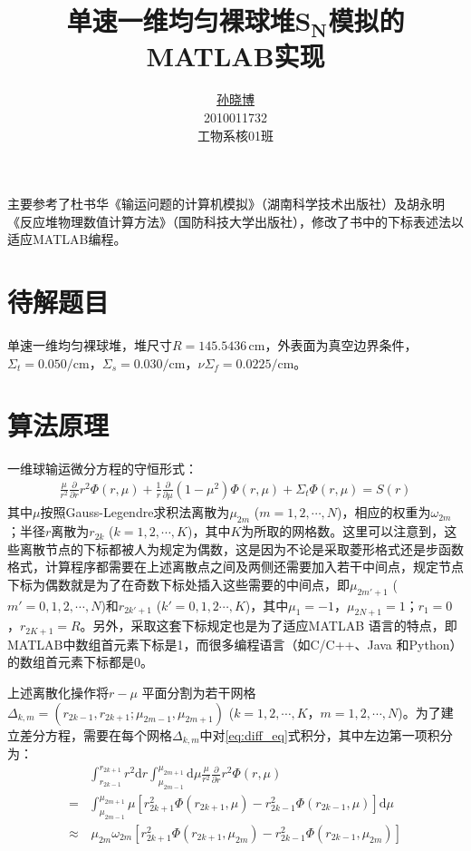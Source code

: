 \documentclass[a4paper,10.5pt]{article}
\title{\heiti 单速一维均匀裸球堆$\boldsymbol{S_{N}}$模拟的MATLAB实现}
\author{\href{mailto:sunxb10@gmail.com}{孙晓博}\\2010011732\\{}工物系核01班}
\date{}
\newcommand\md {\mathrm{d}}
\newcommand \kaiti {\CJKfamily{KaiTi}}
\begin{document}
\maketitle
{\kaiti 主要参考了杜书华《输运问题的计算机模拟》（湖南科学技术出版社）及胡永明《反应堆物理数值计算方法》（国防科技大学出版社），修改了书中的下标表述法以适应MATLAB编程。}\par
\section{待解题目}
单速一维均匀裸球堆，堆尺寸$R=145.5436\,\mathrm{cm}$，外表面为真空边界条件，$\Sigma_{t}=0.050/\mathrm{cm}$，$\Sigma_{s}=0.030/\mathrm{cm}$，$\nu\Sigma_{f}=0.0225/\mathrm{cm}$。\par
\section{算法原理}
一维球输运微分方程的守恒形式：
\begin{align}
\frac{\mu}{r^{2}}\frac{\partial}{\partial{}r}r^{2}\Phi(r,\mu)+\frac{1}{r}\frac{\partial}{\partial\mu}(1-\mu^{2})\Phi(r,\mu)+\Sigma_{t}\Phi(r,\mu)
=S(r)\label{eq:diff_eq}
\end{align}
其中$\mu$按照Gauss-Legendre求积法离散为$\mu_{2m}$ ($m=1,2,\cdots,N$)，相应的权重为$\omega_{2m}$；半径$r$离散为$r_{2k}$ ($k=1,2,\cdots,K$)，其中$K$为所取的网格数。这里可以注意到，这些离散节点的下标都被人为规定为偶数，这是因为不论是采取菱形格式还是步函数格式，计算程序都需要在上述离散点之间及两侧还需要加入若干中间点，规定节点下标为偶数就是为了在奇数下标处插入这些需要的中间点，即$\mu_{2m'+1}$ ($m'=0,1,2,\cdots,N$)和$r_{2k'+1}$ ($k'=0,1,2\cdots,K$)，其中$\mu_{1}=-1$，$\mu_{2N+1}=1$；$r_{1}=0$，$r_{2K+1}=R$。另外，采取这套下标规定也是为了适应MATLAB 语言的特点，即MATLAB中数组首元素下标是1，而很多编程语言（如C/C++、Java 和Python）的数组首元素下标都是0。\par
上述离散化操作将$r-\mu$ 平面分割为若干网格$\Delta_{k,m}=(r_{2k-1},r_{2k+1};\mu_{2m-1},\mu_{2m+1})$ ($k=1,2,\cdots,K$，$m=1,2,\cdots,N$)。为了建立差分方程，需要在每个网格$\Delta_{k,m}$中对\eqref{eq:diff_eq}式积分，其中左边第一项积分为：
\begin{align*}
&\int_{r_{2k-1}}^{r_{2k+1}}r^{2}\md{}r\int_{\mu_{2m-1}}^{\mu_{2m+1}}\md\mu\frac{\mu}{r^{2}}\frac{\partial}{\partial{}r}r^{2}\Phi(r,\mu)\\
=&\int_{\mu_{2m-1}}^{\mu_{2m+1}}\mu\left[r_{2k+1}^{2}\Phi(r_{2k+1},\mu)-r_{2k-1}^{2}\Phi(r_{2k-1},\mu)\right]\md\mu\\
\approx&\,\mu_{2m}\omega_{2m}\left[r_{2k+1}^{2}\Phi(r_{2k+1},\mu_{2m})-r_{2k-1}^{2}\Phi(r_{2k-1},\mu_{2m})\right]
\end{align*}
\end{document}
